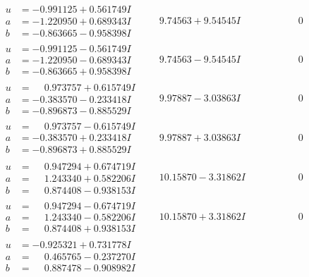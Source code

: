\documentclass[1p]{elsarticle_modified}
\theoremstyle{definition}
\begin{document}
$$\begin{array}{c|c|c}
\begin{aligned}
u &= -0.991125 + 0.561749 I \\
a &= -1.220950 + 0.689343 I \\
b &= -0.863665 - 0.958398 I\end{aligned}
 & \phantom{-}9.74563 + 9.54545 I & \phantom{-0.000000 } 0 \\ \hline\begin{aligned}
u &= -0.991125 - 0.561749 I \\
a &= -1.220950 - 0.689343 I \\
b &= -0.863665 + 0.958398 I\end{aligned}
 & \phantom{-}9.74563 - 9.54545 I & \phantom{-0.000000 } 0 \\ \hline\begin{aligned}
u &= \phantom{-}0.973757 + 0.615749 I \\
a &= -0.383570 - 0.233418 I \\
b &= -0.896873 - 0.885529 I\end{aligned}
 & \phantom{-}9.97887 - 3.03863 I & \phantom{-0.000000 } 0 \\ \hline\begin{aligned}
u &= \phantom{-}0.973757 - 0.615749 I \\
a &= -0.383570 + 0.233418 I \\
b &= -0.896873 + 0.885529 I\end{aligned}
 & \phantom{-}9.97887 + 3.03863 I & \phantom{-0.000000 } 0 \\ \hline\begin{aligned}
u &= \phantom{-}0.947294 + 0.674719 I \\
a &= \phantom{-}1.243340 + 0.582206 I \\
b &= \phantom{-}0.874408 - 0.938153 I\end{aligned}
 & \phantom{-}10.15870 - 3.31862 I & \phantom{-0.000000 } 0 \\ \hline\begin{aligned}
u &= \phantom{-}0.947294 - 0.674719 I \\
a &= \phantom{-}1.243340 - 0.582206 I \\
b &= \phantom{-}0.874408 + 0.938153 I\end{aligned}
 & \phantom{-}10.15870 + 3.31862 I & \phantom{-0.000000 } 0 \\ \hline\begin{aligned}
u &= -0.925321 + 0.731778 I \\
a &= \phantom{-}0.465765 - 0.237270 I \\
b &= \phantom{-}0.887478 - 0.908982 I\end{aligned}

\end{array}$$
\end{document}
